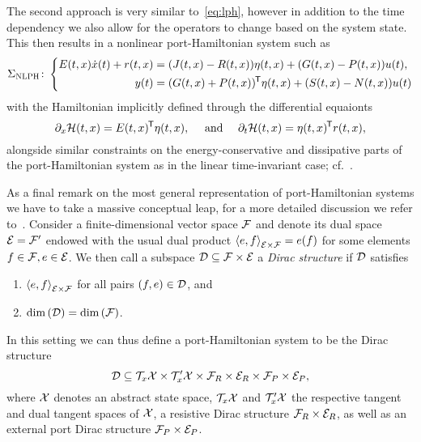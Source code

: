 The second approach is very similar to~\eqref{eq:lph}, however in addition to the time dependency we also allow for the operators to change based on the system state.
This then results in a nonlinear port-Hamiltonian system such as
\begin{equation}\label{eq:nlph}
    \Sigma_{\textsc{NLPH}} \colon \left\lbrace
    \begin{aligned}
        E(t, x) \dot{x}(t) + r(t, x) &= (J(t, x) - R(t, x)) \eta(t, x) + (G(t, x) - P(t, x)) u(t), \\
        y(t) &= (G(t, x) + P(t, x))\trans \eta(t, x) + (S(t, x) - N(t, x)) u(t)
    \end{aligned}
    \right.
\end{equation}
with the Hamiltonian implicitly defined through the differential equaionts
\begin{equation*}
    \pd \mcl{H}(t, x) = E(t, x)\trans \eta(t, x),\quad \text{ and }\quad \pd[t] \mcl{H}(t, x) = \eta(t, x)\trans r(t, x),
\end{equation*}
alongside similar constraints on the energy-conservative and dissipative parts of the port-Hamiltonian system as in the linear time-invariant case; cf.~\cite[Definition~4.1]{Mehrmann2022}.

As a final remark on the most general representation of port-Hamiltonian systems we have to take a massive conceptual leap, for a more detailed discussion we refer to~\cite[Section~2.2]{VanDerSchaft2014}.
Consider a finite-dimensional vector space $\mcl{F}$ and denote its dual space $\mcl{E} = \mcl{F}'$ endowed with the usual dual product ${\langle e, f \rangle}_{\mcl{E} \times \mcl{F}} = e(f)$ for some elements $f \in \mcl{F}, e \in \mcl{E}$.
We then call a subspace $\mcl{D} \sse \mcl{F} \times \mcl{E}$ a \emph{Dirac structure} if $\mcl{D}$ satisfies
\begin{enumerate}
    \item ${\langle e, f \rangle}_{\mcl{E} \times \mcl{F}}$ for all pairs $(f, e) \in \mcl{D}$, and
    \item $\dim{(\mcl{D})} = \dim{(\mcl{F})}$.
\end{enumerate}
In this setting we can thus define a port-Hamiltonian system to be the Dirac structure
\begin{equation*}
    \mcl{D} \sse \mcl{T}_x \mcl{X} \times \mcl{T}'_x \mcl{X} \times \mcl{F}_R \times \mcl{E}_R \times \mcl{F}_P \times \mcl{E}_P,
\end{equation*}
where $\mcl{X}$ denotes an abstract state space, $\mcl{T}_x \mcl{X}$ and $\mcl{T}'_x \mcl{X}$ the respective tangent and dual tangent spaces of $\mcl{X}$, a resistive Dirac structure $\mcl{F}_R \times \mcl{E}_R$, as well as an external port Dirac structure $\mcl{F}_P \times \mcl{E}_P$.

